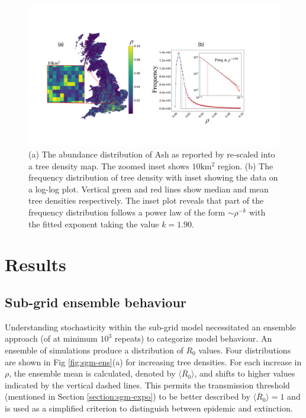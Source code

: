  \begin{figure}
    \centering 
    \includegraphics[scale=0.3]{chapter5/figures/figure2.pdf}
    \caption{(a) The abundance distribution of Ash as reported by \cite{hill.data} re-scaled into a tree density map. The zoomed inset shows $\mathrm{10 km^2}$ region. (b) The frequency distribution of tree density with inset showing the data on a log-log plot. Vertical green and red lines show median and mean tree densities respectively. The inset plot reveals that part of the frequency distribution follows a power law of the form $\sim \rho^{-k}$ with the fitted exponent taking the value $k=1.90$.}
    \label{fig:data-sources}
\end{figure}{}

\section{Results}

\label{section:results}
\subsection{Sub-grid ensemble behaviour}
\label{section:sgm-map-gen} 

Understanding stochasticity within the sub-grid model necessitated an ensemble approach (of at minimum $10^3$ repeats) to categorize model behaviour. An ensemble of simulations produce a distribution of $R_0$ values. Four distributions are shown in Fig \ref{fig:sgm-ens}(a) for increasing tree densities. For each increase in $\rho$, the ensemble mean is calculated, denoted by $\langle \overline{R}_0 \rangle$, and shifts to higher values indicated by the vertical dashed lines. This permits the transmission threshold (mentioned in Section \ref{section:sgm-expo}) to be better described by $\langle \overline{R}_0 \rangle = 1$ and is used as a simplified criterion to distinguish between epidemic and extinction.\\


